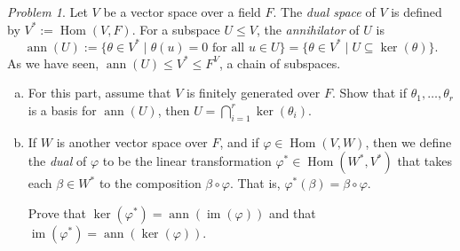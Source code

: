 \documentclass[11pt]{paper}
\theoremstyle{remark}
\newtheorem{problem}{Problem}
\newcommand{\<}{\ensuremath{\langle}}
\renewcommand{\>}{\ensuremath{\rangle}}
\newcommand\Hom{\ensuremath{\operatorname{Hom}}}
\newcommand{\ann}[1]{\ensuremath{\operatorname{ann}(#1)}}
\renewcommand{\ker}[1]{\ensuremath{\operatorname{ker}(#1)}}
\newcommand\im[1]{\ensuremath{\operatorname{im}(#1)}}
\renewcommand{\phi}{\ensuremath{\varphi}}
\renewcommand{\leq}{\ensuremath{\leqslant}}
\begin{document}
\probskip


\begin{problem}
  Let $V$ be a vector space over a field $F$. The \emph{dual space} of
  $V$ is defined by $V^* := \Hom(V, F)$.
  For a subspace $U\leq V$, the \emph{annihilator} of $U$ is
  \[
  \ann{U} := \{\theta \in V^* \mid \theta(u) = 0 \text{ for all } u \in U\}
  = \{\theta \in V^* \mid U \subseteq \ker{\theta}\}.
  \]
  As we have seen, $\ann{U} \leq V^*\leq F^V$, a chain of subspaces.

  \begin{enumerate}[(a)]
  \item For this part, assume that $V$ is finitely generated over $F$. 
    Show that if $\theta_1, \dots, \theta_r$ is a basis for $\ann{U}$,
    then $U = \bigcap\limits_{i=1}^r \ker{\theta_i}$.

\item If $W$ is another vector space over $F$, and if 
  $\phi \in \Hom(V, W)$, then we define the \emph{dual} of $\phi$ to be the
  linear transformation  $\phi^* \in \Hom(W^*, V^*)$ that takes each 
  $\beta \in W^*$ to the composition $\beta\circ \phi$.  
  That is, $\phi^*(\beta)  = \beta \circ \phi$. 
  \begin{center}
  \end{center}
  Prove that $\ker{\phi^*} = \ann{\im{\phi}}$ and that $\im{\phi^*} =
  \ann{\ker{\phi}}$.
  \end{enumerate}

\end{problem}
\end{document}
